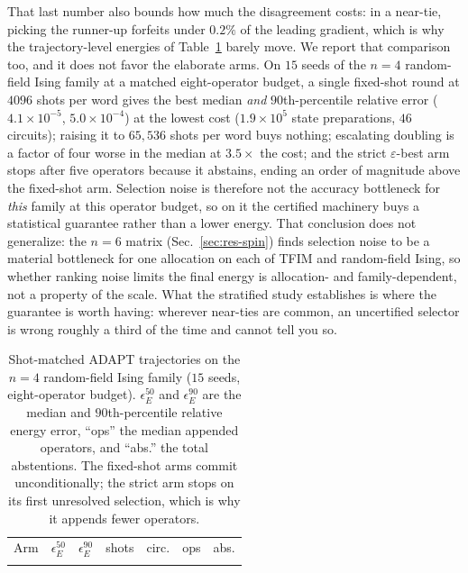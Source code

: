\documentclass[aps,pra,reprint,superscriptaddress,nofootinbib,floatfix]{revtex4-2}
\begin{document}
That last number also bounds how much the disagreement costs: in a near-tie, picking the runner-up forfeits under $0.2\%$ of the leading gradient, which is why the trajectory-level energies of Table~\ref{tab:hardtraj} barely move. We report that comparison too, and it does not favor the elaborate arms. On $15$ seeds of the $n=4$ random-field Ising family at a matched eight-operator budget, a single fixed-shot round at $4096$ shots per word gives the best median \emph{and} $90$th-percentile relative error ($4.1\times10^{-5}$, $5.0\times10^{-4}$) at the lowest cost ($1.9\times10^5$ state preparations, $46$ circuits); raising it to $65{,}536$ shots per word buys nothing; escalating doubling is a factor of four worse in the median at $3.5\times$ the cost; and the strict $\varepsilon$-best arm stops after five operators because it abstains, ending an order of magnitude above the fixed-shot arm. Selection noise is therefore not the accuracy bottleneck for \emph{this} family at this operator budget, so on it the certified machinery buys a statistical guarantee rather than a lower energy. That conclusion does not generalize: the $n=6$ matrix (Sec.~\ref{sec:res-spin}) finds selection noise to be a material bottleneck for one allocation on each of TFIM and random-field Ising, so whether ranking noise limits the final energy is allocation- and family-dependent, not a property of the scale. What the stratified study establishes is where the guarantee is worth having: wherever near-ties are common, an uncertified selector is wrong roughly a third of the time and cannot tell you so.

\begin{table}[t]
\caption{Shot-matched ADAPT trajectories on the $n=4$ random-field Ising family ($15$ seeds, eight-operator budget). $\epsilon_E^{50}$ and $\epsilon_E^{90}$ are the median and $90$th-percentile relative energy error, ``ops'' the median appended operators, and ``abs.'' the total abstentions. The fixed-shot arms commit unconditionally; the strict arm stops on its first unresolved selection, which is why it appends fewer operators.}
\label{tab:hardtraj}
\centering
\footnotesize
\begin{ruledtabular}
\begin{tabular}{lccrccc}
Arm & $\epsilon_E^{50}$ & $\epsilon_E^{90}$ & shots & circ. & ops & abs.\\
\colrule

\end{tabular}
\end{ruledtabular}
\end{table}
\end{document}
